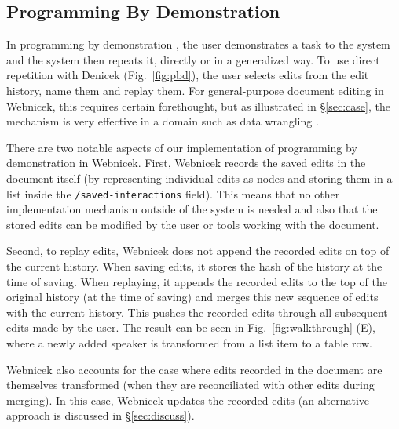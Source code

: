 \documentclass[sigconf,anonymous,screen]{acmart}
\begin{document}

\subsection{Programming By Demonstration}
\label{sec:impl-pbd}

In programming by demonstration \cite{cypher-1993-pbd}, the user demonstrates a task to the
system and the system then repeats it, directly or in a generalized way. To use direct
repetition with Denicek (Fig.~\ref{fig:pbd}), the user selects edits from the edit history,
name them and replay them. For general-purpose document editing in Webnicek, this requires
certain forethought, but as illustrated in \S\ref{sec:case}, the mechanism is very effective
in a domain such as data wrangling \cite{kandel-2011-wrangler}.

There are two notable aspects of our implementation of programming by demonstration in Webnicek.
First, Webnicek records the saved edits in the document itself (by representing individual edits
as nodes and storing them in a list inside the {\small\Verb_/saved-interactions_} field).
This means that no other implementation mechanism outside of the system is needed and also
that the stored edits can be modified by the user or tools working with the document.

Second, to replay edits, Webnicek does not append the recorded edits on top of the current history.
When saving edits, it stores the hash of the history at the time of saving. When replaying,
it appends the recorded edits to the top of the original history (at the time of saving) and merges
this new sequence of edits with the current history. This pushes the recorded edits through all
subsequent edits made by the user. The result can be seen in Fig.~\ref{fig:walkthrough} (E), where
a newly added speaker is transformed from a list item to a table row.

Webnicek also accounts for the case where edits recorded in the document are themselves
transformed (when they are reconciliated with other edits during merging). In this case, Webnicek
updates the recorded edits (an alternative approach is discussed in \S\ref{sec:discuss}).

\end{document}
